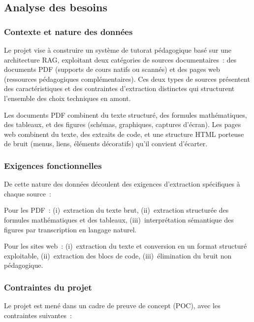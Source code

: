 \documentclass[11pt,a4paper]{article}
\begin{document}
\subsection{Analyse des besoins}

\subsubsection{Contexte et nature des données}

Le projet vise à construire un système de tutorat pédagogique basé sur une architecture RAG, exploitant deux catégories de sources documentaires~: des documents PDF (supports de cours natifs ou scannés) et des pages web (ressources pédagogiques complémentaires). Ces deux types de sources présentent des caractéristiques et des contraintes d'extraction distinctes qui structurent l'ensemble des choix techniques en amont.

Les documents PDF combinent du texte structuré, des formules mathématiques, des tableaux, et des figures (schémas, graphiques, captures d'écran). Les pages web combinent du texte, des extraits de code, et une structure HTML porteuse de bruit (menus, liens, éléments décoratifs) qu'il convient d'écarter.

\subsubsection{Exigences fonctionnelles}

De cette nature des données découlent des exigences d'extraction spécifiques à chaque source~:

Pour les PDF~: (i)~extraction du texte brut, (ii)~extraction structurée des formules mathématiques et des tableaux, (iii)~interprétation sémantique des figures par transcription en langage naturel.

Pour les sites web~: (i)~extraction du texte et conversion en un format structuré exploitable, (ii)~extraction des blocs de code, (iii)~élimination du bruit non pédagogique.

\subsubsection{Contraintes du projet}

Le projet est mené dans un cadre de preuve de concept (POC), avec les contraintes suivantes~:
\end{document}
